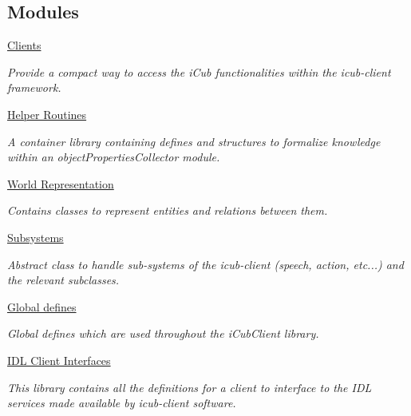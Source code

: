 \subsection*{Modules}
\begin{DoxyCompactItemize}
\item 
\hyperlink{group__icubclient__clients}{Clients}
\begin{DoxyCompactList}\small\item\em Provide a compact way to access the i\+Cub functionalities within the icub-\/client framework. \end{DoxyCompactList}\item 
\hyperlink{group__icubclient__helpers}{Helper Routines}
\begin{DoxyCompactList}\small\item\em A container library containing defines and structures to formalize knowledge within an object\+Properties\+Collector module. \end{DoxyCompactList}\item 
\hyperlink{group__icubclient__representations}{World Representation}
\begin{DoxyCompactList}\small\item\em Contains classes to represent entities and relations between them. \end{DoxyCompactList}\item 
\hyperlink{group__icubclient__subsystems}{Subsystems}
\begin{DoxyCompactList}\small\item\em Abstract class to handle sub-\/systems of the icub-\/client (speech, action, etc...) and the relevant subclasses. \end{DoxyCompactList}\item 
\hyperlink{group__icubclient__tags}{Global defines}
\begin{DoxyCompactList}\small\item\em Global defines which are used throughout the i\+Cub\+Client library. \end{DoxyCompactList}\item 
\hyperlink{group__icubclient__IDLClients}{I\+D\+L Client Interfaces}
\begin{DoxyCompactList}\small\item\em This library contains all the definitions for a client to interface to the I\+DL services made available by icub-\/client software. \end{DoxyCompactList}\end{DoxyCompactItemize}


